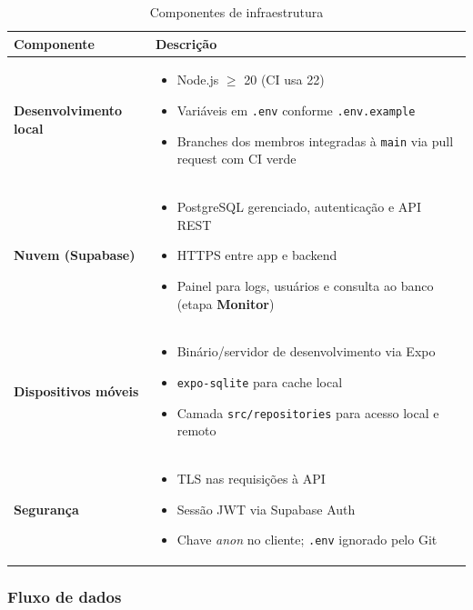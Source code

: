 \documentclass[11pt,a4paper]{article}
\begin{document}
\begin{table}[H]
\centering
\caption{Componentes de infraestrutura}
\label{tab:infrastructure}
\begin{tabular}{|l|p{10cm}|}
\hline
\textbf{Componente} & \textbf{Descrição} \\
\hline
\textbf{Desenvolvimento local} &
\begin{itemize}[leftmargin=*, nosep]
    \item Node.js $\geq$ 20 (CI usa 22)
    \item Variáveis em \texttt{.env} conforme \texttt{.env.example}
    \item Branches dos membros integradas à \texttt{main} via pull request com CI verde
\end{itemize} \\
\hline
\textbf{Nuvem (Supabase)} &
\begin{itemize}[leftmargin=*, nosep]
    \item PostgreSQL gerenciado, autenticação e API REST
    \item HTTPS entre app e backend
    \item Painel para logs, usuários e consulta ao banco (etapa \textbf{Monitor})
\end{itemize} \\
\hline
\textbf{Dispositivos móveis} &
\begin{itemize}[leftmargin=*, nosep]
    \item Binário/servidor de desenvolvimento via Expo
    \item \texttt{expo-sqlite} para cache local
    \item Camada \texttt{src/repositories} para acesso local e remoto
\end{itemize} \\
\hline
\textbf{Segurança} &
\begin{itemize}[leftmargin=*, nosep]
    \item TLS nas requisições à API
    \item Sessão JWT via Supabase Auth
    \item Chave \textit{anon} no cliente; \texttt{.env} ignorado pelo Git
\end{itemize} \\
\hline
\end{tabular}
\end{table}

\subsubsection{Fluxo de dados}
\end{document}
